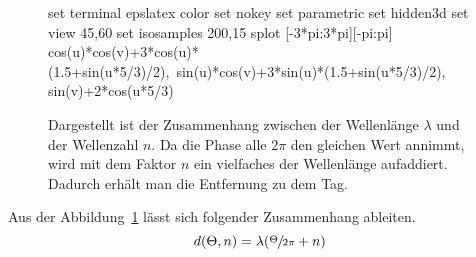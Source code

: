 \begin{figure}[h!]
	\caption[Zusammenhang Wellenlänge - Wellenzahl]{Dargestellt ist der Zusammenhang zwischen der Wellenlänge $\lambda$ und der Wellenzahl $n$. Da die Phase alle $2\pi$ den gleichen Wert annimmt, wird mit dem Faktor $n$ ein vielfaches der Wellenlänge aufaddiert. Dadurch erhält man die Entfernung zu dem Tag.}
	\label{fig:wavenumber_wavelength}
	\begin{gnuplot} %
		set terminal epslatex color %
		set nokey %
		set parametric
		set hidden3d
		set view 45,60
		set isosamples 200,15
		splot [-3*pi:3*pi][-pi:pi] cos(u)*cos(v)+3*cos(u)*(1.5+sin(u*5/3)/2),\
		sin(u)*cos(v)+3*sin(u)*(1.5+sin(u*5/3)/2), sin(v)+2*cos(u*5/3)
	\end{gnuplot}	
\end{figure}
%
%        

Aus der Abbildung~\ref{fig:wavenumber_wavelength} lässt sich folgender Zusammenhang ableiten.
%
\begin{equation}
\label{eq:Phase_Wavenumber}
	d(\Theta, n)=\lambda(\sfrac{\Theta}{2\pi}+n)
\end{equation}